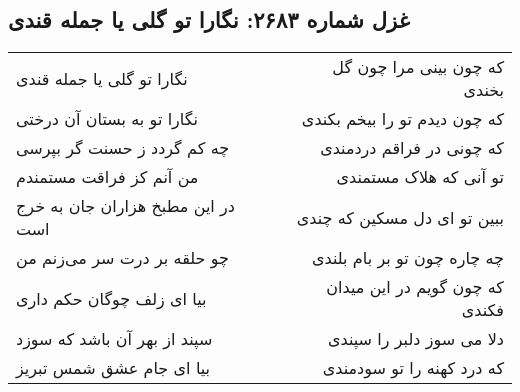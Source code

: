 \begin{center}
\section*{غزل شماره ۲۶۸۳: نگارا تو گلی یا جمله قندی}
\label{sec:2683}
\begin{longtable}{l p{0.5cm} r}
نگارا تو گلی یا جمله قندی
&&
که چون بینی مرا چون گل بخندی
\\
نگارا تو به بستان آن درختی
&&
که چون دیدم تو را بیخم بکندی
\\
چه کم گردد ز حسنت گر بپرسی
&&
که چونی در فراقم دردمندی
\\
من آنم کز فراقت مستمندم
&&
تو آنی که هلاک مستمندی
\\
در این مطبخ هزاران جان به خرج است
&&
ببین تو ای دل مسکین که چندی
\\
چو حلقه بر درت سر می‌زنم من
&&
چه چاره چون تو بر بام بلندی
\\
بیا ای زلف چوگان حکم داری
&&
که چون گویم در این میدان فکندی
\\
سپند از بهر آن باشد که سوزد
&&
دلا می سوز دلبر را سپندی
\\
بیا ای جام عشق شمس تبریز
&&
که درد کهنه را تو سودمندی
\\
\end{longtable}
\end{center}
